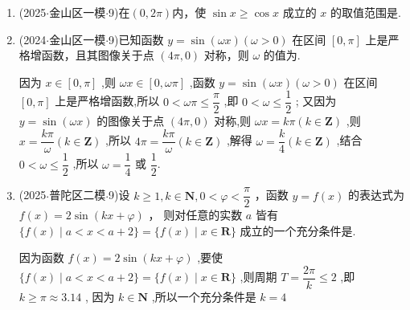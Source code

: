 \begin{enumerate}
    \item (2025$\cdot$金山区一模$\cdot$9)在$(0,2\pi)$内，使 $\sin x \geq  \cos x$ 成立的 $x$ 的取值范围是.

    \item (2024$\cdot$金山区一模$\cdot$9)已知函数 $y = \sin \left( {\omega x}\right) \left( {\omega  > 0}\right)$ 在区间 $\left\lbrack  {0,\pi }\right\rbrack$ 上是严格增函数，且其图像关于点 $\left( {{4\pi },0}\right)$ 对称，则 $\omega$ 的值为.
    \begin{jieda}
        因为 $x \in  \left\lbrack  {0,\pi }\right\rbrack$ ,则 ${\omega x} \in  \left\lbrack  {0,{\omega \pi }}\right\rbrack$ ,函数 $y = \sin \left( {\omega x}\right)  \left( {\omega  > 0}\right)$ 在区间 $\left\lbrack  {0,\pi }\right\rbrack$ 上是严格增函数,所以 $0 < {\omega \pi } \leq  \dfrac{\pi }{2}$ ,即 $0 < \omega  \leq  \dfrac{1}{2}$ ; 又因为 $y = \sin \left( {\omega x}\right)$ 的图像关于点 $\left( {{4\pi },0}\right)$ 对称,则 ${\omega x} = {k\pi }\left( {k \in  \mathbf{Z}}\right)$ ,则 $x = \dfrac{k\pi }{\omega }\left( {k \in  \mathbf{Z}}\right)$ ,所以 ${4\pi } = \dfrac{k\pi }{\omega }\left( {k \in  \mathbf{Z}}\right)$ ,解得 $\omega  = \dfrac{k}{4}\left( {k \in  \mathbf{Z}}\right)$ ,结合 $0 < \omega  \leq  \dfrac{1}{2}$ ,所以 $\omega  = \dfrac{1}{4}$ 或 $\dfrac{1}{2}$.
    \end{jieda}

    \item (2025$\cdot$普陀区二模$\cdot$9)设 $k \geq  1,k \in  \mathbf{N},0 < \varphi  < \dfrac{\pi }{2}$ ，函数 $y = f\left( x\right)$ 的表达式为 $f\left( x\right)  = 2\sin \left( {{kx} + \varphi }\right)$ ， 则对任意的实数 $a$ 皆有 $\{ f\left( x\right)  \mid  a < x < a + 2\}  = \{ f\left( x\right)  \mid  x \in  \mathbf{R}\}$ 成立的一个充分条件是.
    \begin{jieda}
        因为函数 $f\left( x\right)  = 2\sin \left( {{kx} + \varphi }\right)$ ,要使 $\{ f\left( x\right)  \mid  a < x <  a + 2\}  = \{ f\left( x\right)  \mid  x \in  \mathbf{R}\}$ ,则周期 $T = \dfrac{2\pi }{k} \leq  2$ ,即 $k \geq  \pi  \approx  {3.14}$ , 因为 $k \in  \mathbf{N}$ ,所以一个充分条件是 $k = 4$
    \end{jieda}


\end{enumerate}
